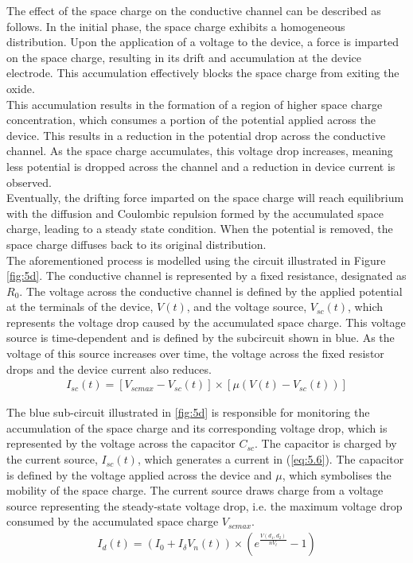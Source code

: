 \noindent The effect of the space charge on the conductive channel can be described as follows. In the initial phase, the space charge exhibits a homogeneous distribution. Upon the application of a voltage to the device, a force is imparted on the space charge, resulting in its drift and accumulation at the device electrode. This accumulation effectively blocks the space charge from exiting the oxide.  \\

\noindent This accumulation results in the formation of a region of higher space charge concentration, which consumes a portion of the potential applied across the device. This results in a reduction in the potential drop across the conductive channel. As the space charge accumulates, this voltage drop increases, meaning less potential is dropped across the channel and a reduction in device current is observed. \\

\noindent Eventually, the drifting force imparted on the space charge will reach equilibrium with the diffusion and Coulombic repulsion formed by the accumulated space charge, leading to a steady state condition. When the potential is removed, the space charge diffuses back to its original distribution. \\

\noindent The aforementioned process is modelled using the circuit illustrated in Figure \ref{fig:5d}. The conductive channel is represented by a fixed resistance, designated as $R_0$. The voltage across the conductive channel is defined by the applied potential at the terminals of the device, $V(t)$, and the voltage source, $V_{sc}(t)$, which represents the voltage drop caused by the accumulated space charge. This voltage source is time-dependent and is defined by the subcircuit shown in blue. As the voltage of this source increases over time, the voltage across the fixed resistor drops and the device current also reduces.
\begin{align}
I_{sc}(t) = \left[ V_{scmax} - V_{sc}(t) \right] \times \left[ \mu \left( V(t) - V_{sc}(t) \right) \right] \label{eq:5.6} 
\end{align}

\noindent The blue sub-circuit illustrated in \ref{fig:5d} is responsible for monitoring the accumulation of the space charge and its corresponding voltage drop, which is represented by the voltage across the capacitor $C_{sc}$. The capacitor is charged by the current source, $I_{sc}(t)$, which generates a current in (\ref{eq:5.6}). The capacitor is defined by the voltage applied across the device and $\mu$, which symbolises the mobility of the space charge. The current source draws charge from a voltage source representing the steady-state voltage drop, i.e. the maximum voltage drop consumed by the accumulated space charge $V_{scmax}$.
\begin{align}
I_d(t) = \left( I_0 + I_{\delta} V_n(t) \right)\times \left( e^{\frac{V(d_1,d_2)}{nV_t} }  - 1\right) \label{eq:5.7}
\end{align}

